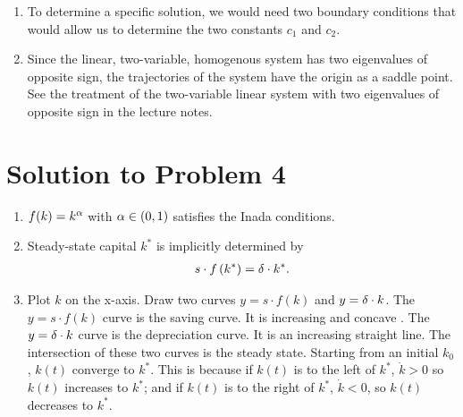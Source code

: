\documentclass[letterpaper,12pt,leqno]{article}
\begin{document}
\begin{enumerate}
\item To determine a specific solution, we would need two boundary conditions that would allow us to determine the two constants $c_{1}$ and $c_{2}$.
\item Since the linear, two-variable, homogenous system has two eigenvalues of opposite sign, the trajectories of the system have the origin as a saddle point. See the treatment of the two-variable linear system with two eigenvalues of opposite sign in the lecture notes.
\end{enumerate}

\section*{Solution to Problem 4}

\begin{enumerate}
\item $f(k)=k^{\alpha}$ with $\alpha\in(0,1)$ satisfies the Inada conditions.
\item Steady-state capital $k^*$ is implicitly determined by
\begin{align*}
s\cdot f\left( k^* \right) =\delta \cdot k^*.
\end{align*}

\item Plot $k$ on the x-axis. Draw two curves $y=s\cdot f(k) $ and $y=\delta\cdot k$. The $y=s\cdot f(k)$ curve is the saving curve. It is increasing and concave . The $y=\delta\cdot  k$ curve is the depreciation curve. It is an increasing straight line. The intersection of these two curves is the steady state. Starting
from an initial $k_{0}$, $k(t)$ converge to $k^*$. This is because if $k(t)$ is to the left of $k^*$, $\dot{k}>0$
so $k(t)$ increases to $k^{*}$; and if $k(t)$ is to the right of $k^*$, $\dot{k}<0$, so $k(t)$ decreases to $k^{*}$.
\end{enumerate}
\end{document}
